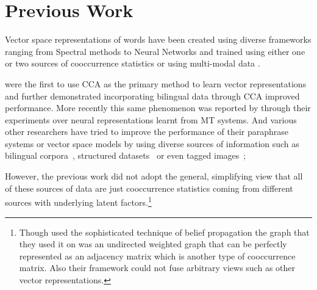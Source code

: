 \documentclass[11pt]{article}
\newcommand{\remove}[1]{}
\begin{document}
\section{Previous Work}
\label{sec:previouswork}
Vector space representations of words have been created using diverse
 frameworks ranging from Spectral methods
 \cite{dhillon2011multi,dhillon2012two}
 to Neural Networks
 \cite{mikolov2013efficient,mikolov2013distributed,collobert2013word}
 and trained using either one
 \cite{pennington2014glove}
 or two sources of cooccurrence statistics
 \cite{zou2013bilingual,faruqui2014improving,bansal2014tailoring,levy2014dependency}
 or using multi-modal data
 \cite{felix2014learning,bruni2012distributional}.
 
\cite{dhillon2011multi,dhillon2012two} were the first to use
CCA as the primary method to learn vector representations and
\cite{faruqui2014improving} further demonstrated incorporating bilingual
data through CCA improved performance. More recently this same
phenomenon was reported by  through their
experiments over neural representations learnt from MT systems.
And various other researchers have tried to improve the
performance of their paraphrase systems or vector space models by using
diverse sources of information such as bilingual
corpora~\cite{bannard2005paraphrasing,Huang2012Improving,zou2013bilingual}, 
structured datasets~\cite{yu2014improving,faruqui2014retrofitting} or even
tagged images~\cite{bruni2012distributional}; 
\remove{The intuitive reason that using multiple sources of data improves performance is 
that the views complement each other. For example it was mentioned in
\cite{ganitkevitch2013ppdb} that monolingual data can't distinguish
between antonyms but bilingual data can. And bilingual data confounds
words that occur in the same sentence but monolingual data can
distinguish them based on their context.}
However, the previous
work did not adopt the general, simplifying view that 
all of these sources of data are just cooccurrence 
statistics coming from different sources with underlying latent
factors.\footnote{Though \cite{faruqui2014retrofitting} used
  the sophisticated technique of belief propagation the graph that
  they used it on was an undirected weighted graph that can be
  perfectly represented as an adjacency matrix which is another type of
cooccurrence matrix. Also their framework could not fuse arbitrary views such as
other vector representations.}
\end{document}
